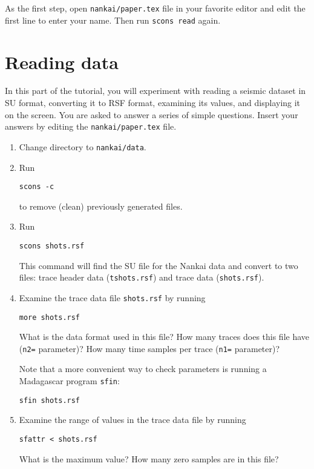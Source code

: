 As the first step, open \texttt{nankai/paper.tex} file in your favorite
editor and edit the first line to enter your name. Then
run \texttt{scons read} again.

\section{Reading data}

In this part of the tutorial, you will experiment with reading a
seismic dataset in SU format, converting it to RSF format, examining
its values, and displaying it on the screen. You are asked to answer a
series of simple questions. Insert your answers by editing
the \texttt{nankai/paper.tex} file.

\begin{enumerate}          
\item Change directory to \texttt{nankai/data}.
\item Run
\begin{verbatim}
scons -c
\end{verbatim}
to remove (clean) previously generated files.
\item Run
\begin{verbatim}
scons shots.rsf
\end{verbatim}
This command will find the SU file for the Nankai data and convert to two files: trace header data (\texttt{tshots.rsf}) and trace data (\texttt{shots.rsf}).
\item Examine the trace data file \texttt{shots.rsf} by running
\begin{verbatim}
more shots.rsf
\end{verbatim}
What is the data format used in this file? How many traces does this file have (\texttt{n2=} parameter)? How many time samples per trace (\texttt{n1=} parameter)?

\answer{
}       

Note that a more convenient way to check parameters is running a Madagascar program \texttt{sfin}:
\begin{verbatim}
sfin shots.rsf
\end{verbatim}
\item Examine the range of values in the trace data file by running
\begin{verbatim}
sfattr < shots.rsf
\end{verbatim}
What is the maximum value? How many zero samples are in this file?

\answer{
}


\end{enumerate}
